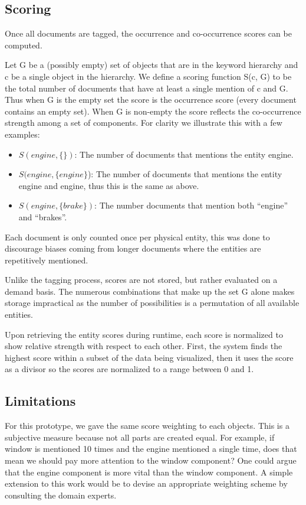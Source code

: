 \subsection{Scoring}
Once all documents are tagged, the occurrence and co-occurrence scores can be
computed. 

Let G be a (possibly empty) set of objects that are in the keyword hierarchy and
c be a single object in the hierarchy. We define a scoring function S(c, G) to be 
the total number of documents that have at least a single mention of c and G. Thus 
when G is the empty set the score is the occurrence score (every document 
contains an empty set). When G is non-empty the score reflects the co-occurrence 
strength among a set of components. For clarity we illustrate this with a few examples:
\begin{itemize} [noitemsep]
  \item $S(engine, \{\})$: The number of documents that mentions the entity
  engine.
  
  \item $S(engine, \{engine\}$): The number of documents that mentions the
  entity engine and engine, thus this is the same as above. 
  
  \item $S(engine, \{brake\})$: The number documents that mention both
  ``engine'' and ``brakes''. 
\end{itemize}

Each document is only counted once per physical entity, this was done to
discourage biases coming from longer documents where the entities are
repetitively mentioned.

Unlike the tagging process, scores are not stored, but rather
evaluated on a demand basis. The numerous combinations that make up the set G
alone makes storage impractical as the number of possibilities is a permutation
of all available entities.
 
Upon retrieving the entity scores during runtime, each score is normalized
to show relative strength with respect to each other. First, the system finds
the highest score within a subset of the data being visualized, then it uses the
score as a divisor so the scores are normalized to a range between 0 and 1.

  
\subsection{Limitations} 
For this prototype, we gave the same score weighting to each objects. This is a 
subjective measure because not all parts are created equal. For example, if window 
is mentioned 10 times and the engine mentioned a single time, does that mean we 
should pay more attention to the window component? One could argue that the engine 
component is more vital than the window component. A simple extension to this
work would be to devise an appropriate weighting scheme by consulting the domain
experts. 

